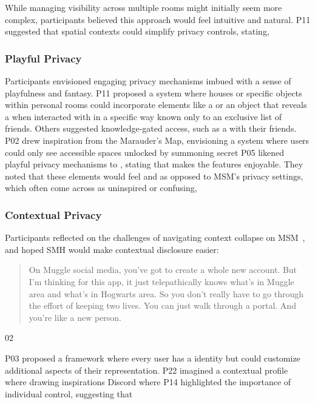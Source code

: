 While managing visibility across multiple rooms might initially seem more complex, participants believed this approach would feel intuitive and natural. P11 suggested that spatial contexts could simplify privacy controls, stating,  

\subsubsection{Playful Privacy}
\label{lab:4-4-2}
Participants envisioned engaging privacy mechanisms imbued with a sense of playfulness and fantasy. P11 proposed a system where houses or specific objects within personal rooms could incorporate elements like a  or an object that reveals a  when interacted with in a specific way known only to an exclusive list of friends. Others suggested knowledge-gated access, such as a  with their friends. P02 drew inspiration from the Marauder's Map, envisioning a system where users could only see accessible spaces unlocked by summoning secret  P05 likened playful privacy mechanisms to , stating  that makes the features enjoyable. They noted that these elements would feel  and  as opposed to MSM's privacy settings, which often come across as uninspired or confusing,  

\subsubsection{Contextual Privacy}
\label{lab:4-4-3}
Participants reflected on the challenges of navigating context collapse on MSM~\cite{BoydMarwick-2011-ITweetAudience-z}, and hoped SMH would make contextual disclosure easier: \blockquote{On Muggle social media, you've got to create a whole new account. But I'm thinking for this app, it just telepathically knows what's in Muggle area and what's in Hogwarts area. So you don't really have to go through the effort of keeping two lives. You can just walk through a portal. And you're like a new person.}{02}

P03 proposed a framework where every user has a  identity but could customize additional aspects of their representation. P22 imagined a contextual profile where  drawing inspirations Discord where  P14 highlighted the importance of individual control, suggesting that 

